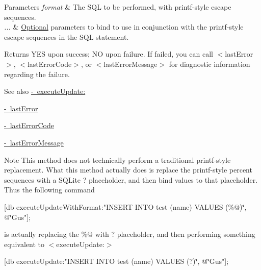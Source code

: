 \begin{DoxyParams}{Parameters}
{\em format} & The S\+QL to be performed, with {\ttfamily printf}-\/style escape sequences.\\
\hline
{\em ...} & \mbox{\hyperlink{protocol_optional-p}{Optional}} parameters to bind to use in conjunction with the {\ttfamily printf}-\/style escape sequences in the S\+QL statement.\\
\hline
\end{DoxyParams}
\begin{DoxyReturn}{Returns}
{\ttfamily Y\+ES} upon success; {\ttfamily NO} upon failure. If failed, you can call {\ttfamily $<$last\+Error$>$}, {\ttfamily $<$last\+Error\+Code$>$}, or {\ttfamily $<$last\+Error\+Message$>$} for diagnostic information regarding the failure.
\end{DoxyReturn}
\begin{DoxySeeAlso}{See also}
\mbox{\hyperlink{interface_o_p_t_l_y_f_m_d_b_database_aacce81f6c3456a804e1d558462bca313}{-\/ execute\+Update\+:}} 

\mbox{\hyperlink{interface_o_p_t_l_y_f_m_d_b_database_a477a6ff4d9daaac53a56c0a058a0d2f7}{-\/ last\+Error}} 

\mbox{\hyperlink{interface_o_p_t_l_y_f_m_d_b_database_a9f15cf87d3c764783ce0c6beb39393a9}{-\/ last\+Error\+Code}} 

\mbox{\hyperlink{interface_o_p_t_l_y_f_m_d_b_database_a082c5d58576df07956308656064e1f63}{-\/ last\+Error\+Message}}
\end{DoxySeeAlso}
\begin{DoxyNote}{Note}
This method does not technically perform a traditional printf-\/style replacement. What this method actually does is replace the printf-\/style percent sequences with a S\+Q\+Lite {\ttfamily ?} placeholder, and then bind values to that placeholder. Thus the following command
\end{DoxyNote}
\mbox{[}db execute\+Update\+With\+Format\+:"I\+N\+S\+E\+RT I\+N\+TO test (name) V\+A\+L\+U\+ES (\%@)\char`\"{}, @\char`\"{}Gus"\mbox{]};

is actually replacing the {\ttfamily \%@} with {\ttfamily ?} placeholder, and then performing something equivalent to {\ttfamily $<$execute\+Update\+:$>$}

\mbox{[}db execute\+Update\+:"I\+N\+S\+E\+RT I\+N\+TO test (name) V\+A\+L\+U\+ES (?)\char`\"{}, @\char`\"{}Gus"\mbox{]};

